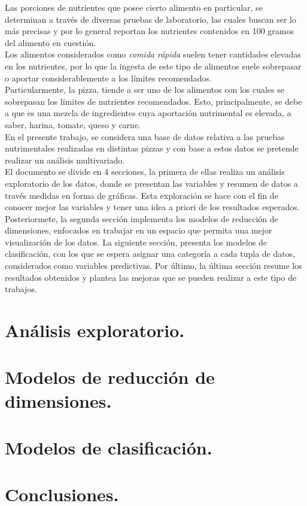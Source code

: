 \documentclass[12pt, letterpaper]{article}
\begin{document}
Las porciones de nutrientes que posee cierto alimento en particular, se determinan a través de diversas pruebas de laboratorio, las cuales buscan ser lo más precisas y por lo general reportan los nutrientes contenidos en 100 gramos del alimento en cuestión.\\

Los alimentos considerados como \emph{comida rápida} suelen tener cantidades elevadas en los nutrientes, por lo que la ingesta de este tipo de alimentos suele sobrepasar o aportar considerablemente a los límites recomendados.\\

Particularmente, la pizza, tiende a ser uno de los alimentos con los cuales se sobrepasan los límites de nutrientes recomendados. Esto, principalmente, se debe a que es una mezcla de ingredientes cuya aportación nutrimental es elevada, a saber, harina, tomate, queso y carne.\\
 
En el presente trabajo, se considera una base de datos relativa a las pruebas nutrimentales realizadas en distintas pizzas y con base a estos datos se pretende realizar un análisis multivariado.\\

El documento se divide en 4 secciones, la primera de ellas realiza un análisis exploratorio de los datos, donde se presentan las variables y resumen de datos a través medidas en forma de gráficas. Esta exploración se hace con el fin de conocer mejor las variables y tener una idea a priori de los resultados esperados. Posteriormete, la segunda sección implementa los modelos de reducción de dimensiones, enfocados en trabajar en un espacio que permita una mejor visualización de los datos. La siguiente sección, presenta los modelos de clasificación, con los que se espera asignar una categoría a cada tupla de datos, considerados como variables predictivas. Por último, la última sección resume los resultados obtenidos y plantea las mejoras que se pueden realizar a este tipo de trabajos.


\pagebreak

\section{Análisis exploratorio.}

\section{Modelos de reducción de dimensiones.}

\section{Modelos de clasificación.}

\section{Conclusiones.}
\end{document}
